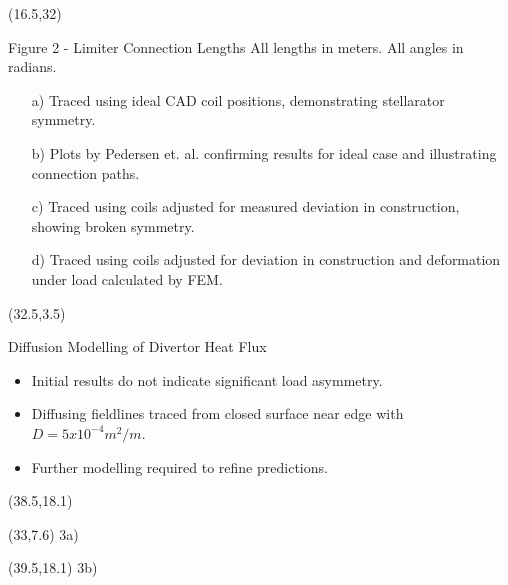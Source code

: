 \documentclass{beamer}
\begin{document}
\begin{frame}[t]
\begin{textblock}{15}(16.5,32)
\begin{block}{Figure 2 - Limiter Connection Lengths}
All lengths in meters. All angles in radians.
\begin{itemize}
\item[a)] Traced using ideal CAD coil positions, demonstrating stellarator symmetry.
\item[b)] Plots by Pedersen et. al.\cite{pederson} confirming results for ideal case and illustrating connection paths.
\item[c)] Traced using coils adjusted for measured deviation in construction\cite{andreeva}, showing broken symmetry.
\item[d)] Traced using coils adjusted for deviation in construction and deformation under load calculated by FEM\cite{andreeva}.
\end{itemize}
\end{block}
\end{textblock}




\begin{textblock}{15}(32.5,3.5)
{\Large
\begin{block}{Diffusion Modelling of Divertor Heat Flux}
\begin{itemize}
\item Initial results do not indicate significant load asymmetry.
\item Diffusing fieldlines traced from closed surface near edge with $D=5x10^{-4}m^2/m$.
\item Further modelling required to refine predictions.
\end{itemize}
\end{block}
}
\end{textblock}


\begin{textblock}{15}(38.5,18.1)
\end{textblock}
\begin{textblock}{15}(33,7.6)
3a)\break
\end{textblock}
\begin{textblock}{15}(39.5,18.1)
3b)\break
\end{textblock}



\end{frame}
\end{document}
